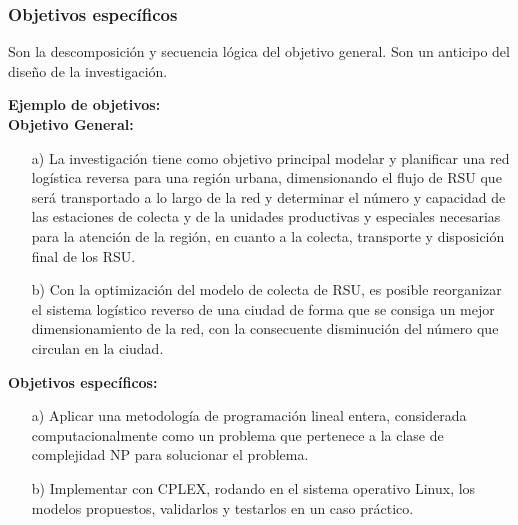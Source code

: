 \documentclass[a4paper, 12pt]{article}
\begin{document}
\subsubsection{Objetivos específicos}
Son la descomposición y secuencia lógica del objetivo general. Son un anticipo del diseño de la investigación.
\vskip 0.3cm


{\bf Ejemplo de objetivos:}\\
{\bf Objetivo General:}
\begin{enumerate}
\item[a)] La investigación tiene como objetivo principal modelar y planificar una red logística reversa para una región urbana, dimensionando el flujo de RSU que será transportado a lo largo de la red y determinar el número y capacidad de las estaciones de colecta y de la unidades productivas y especiales necesarias para la atención de la región, en cuanto a la colecta, transporte y disposición final de los RSU.
\vskip 0.3cm
\item[b)]Con la optimización del modelo de colecta de RSU, es posible reorganizar el sistema logístico reverso de una ciudad de forma que se consiga un mejor dimensionamiento de la red, con la consecuente disminución del número que circulan en la ciudad.

\end{enumerate}
\vskip 0.2cm
{\bf Objetivos específicos:}
\begin{enumerate}
\item[a)] Aplicar una metodología de programación lineal entera, considerada computacionalmente como un problema que pertenece a la clase de complejidad NP \citep{Korte} para solucionar el problema.
\item[b)] Implementar con CPLEX, rodando en el sistema operativo Linux, los modelos propuestos, validarlos y testarlos en un caso práctico.

\end{enumerate}
\end{document}
